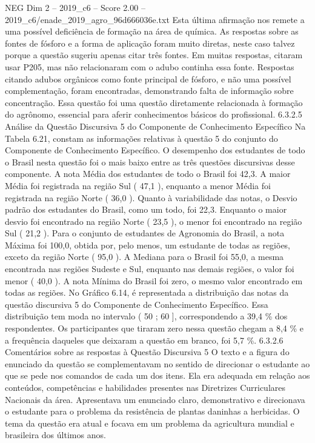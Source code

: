 \begin{textsample}{NEG Dim 2 – 2019\_c6 – Score 2.00 – 2019\_c6/enade\_2019\_agro\_96d666036e.txt}
Esta última afirmação nos remete a uma possível deficiência de formação na área de química.
As respostas sobre as fontes de fósforo e a forma de aplicação foram muito diretas, neste caso talvez porque a questão sugeriu apenas citar três fontes.
Em muitas respostas, citaram usar P205, mas não relacionaram com o adubo continha essa fonte.
Respostas citando adubos orgânicos como fonte principal de fósforo, e não uma possível complementação, foram encontradas, demonstrando falta de informação sobre concentração.
Essa questão foi uma questão diretamente relacionada à formação do agrônomo, essencial para aferir conhecimentos básicos do profissional. 6.3.2.5 Análise da Questão Discursiva 5 do Componente de Conhecimento Específico Na Tabela 6.21, constam as informações relativas à questão 5 do conjunto do Componente de Conhecimento Específico.
O desempenho dos estudantes de todo o Brasil nesta questão foi o mais baixo entre as três questões discursivas desse componente.
A nota Média dos estudantes de todo o Brasil foi 42,3.
A maior Média foi registrada na região Sul ( 47,1 ), enquanto a menor Média foi registrada na região Norte ( 36,0 ).
Quanto à variabilidade das notas, o Desvio padrão dos estudantes do Brasil, como um todo, foi 22,3.
Enquanto o maior desvio foi encontrado na região Norte ( 23,5 ), o menor foi encontrado na região Sul ( 21,2 ).
Para o conjunto de estudantes de Agronomia do Brasil, a nota Máxima foi 100,0, obtida por, pelo menos, um estudante de todas as regiões, exceto da região Norte ( 95,0 ).
A Mediana para o Brasil foi 55,0, a mesma encontrada nas regiões Sudeste e Sul, enquanto nas demais regiões, o valor foi menor ( 40,0 ).
A nota Mínima do Brasil foi zero, o mesmo valor encontrado em todas as regiões.
No Gráfico 6.14, é representada a distribuição das notas da questão discursiva 5 do Componente de Conhecimento Específico.
Essa distribuição tem moda no intervalo ( 50 ; 60 ], correspondendo a 39,4 \% dos respondentes.
Os participantes que tiraram zero nessa questão chegam a 8,4 \% e a frequência daqueles que deixaram a questão em branco, foi 5,7 \%. 6.3.2.6 Comentários sobre as respostas à Questão Discursiva 5 O texto e a figura do enunciado da questão se complementavam no sentido de direcionar o estudante ao que se pede nos comandos de cada um dos itens.
Ela era adequada em relação aos conteúdos, competências e habilidades presentes nas Diretrizes Curriculares Nacionais da área.
Apresentava um enunciado claro, demonstrativo e direcionava o estudante para o problema da resistência de plantas daninhas a herbicidas.
O tema da questão era atual e focava em um problema da agricultura mundial e brasileira dos últimos anos.

\end{textsample}
